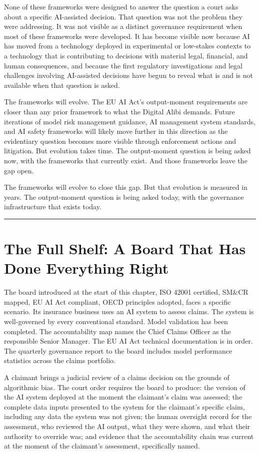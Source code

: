 None of these frameworks were designed to answer the question a court asks about a specific AI-assisted decision. That question was not the problem they were addressing. It was not visible as a distinct governance requirement when most of these frameworks were developed. It has become visible now because AI has moved from a technology deployed in experimental or low-stakes contexts to a technology that is contributing to decisions with material legal, financial, and human consequences, and because the first regulatory investigations and legal challenges involving AI-assisted decisions have begun to reveal what is and is not available when that question is asked.

The frameworks will evolve. The EU AI Act's output-moment requirements are closer than any prior framework to what the Digital Alibi demands. Future iterations of model risk management guidance, AI management system standards, and AI safety frameworks will likely move further in this direction as the evidentiary question becomes more visible through enforcement actions and litigation. But evolution takes time. The output-moment question is being asked now, with the frameworks that currently exist. And those frameworks leave the gap open.

The frameworks will evolve to close this gap. But that evolution is measured in years. The output-moment question is being asked today, with the governance infrastructure that exists today.

\begin{center}\rule{0.5\linewidth}{0.5pt}\end{center}

\section{The Full Shelf: A Board That Has Done Everything Right}

The board introduced at the start of this chapter, ISO 42001 certified, SM\&CR mapped, EU AI Act compliant, OECD principles adopted, faces a specific scenario. Its insurance business uses an AI system to assess claims. The system is well-governed by every conventional standard. Model validation has been completed. The accountability map names the Chief Claims Officer as the responsible Senior Manager. The EU AI Act technical documentation is in order. The quarterly governance report to the board includes model performance statistics across the claims portfolio.

A claimant brings a judicial review of a claims decision on the grounds of algorithmic bias. The court order requires the board to produce: the version of the AI system deployed at the moment the claimant's claim was assessed; the complete data inputs presented to the system for the claimant's specific claim, including any data the system was not given; the human oversight record for the assessment, who reviewed the AI output, what they were shown, and what their authority to override was; and evidence that the accountability chain was current at the moment of the claimant's assessment, specifically named.

